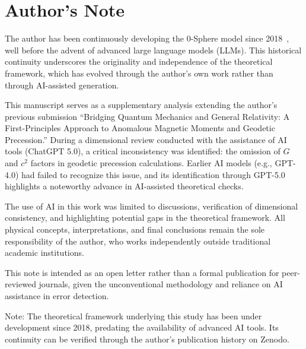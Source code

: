 \documentclass[%
 reprint,
 amsmath,amssymb,
 aps,
]{revtex4-1}
\numberwithin{equation}{section}%
\begin{document}
\section*{Author's Note}
The author has been continuously developing the 0-Sphere model since 2018~\cite{zenodo.16759284}, well before the advent of advanced large language models (LLMs). This historical continuity underscores the originality and independence of the theoretical framework, which has evolved through the author’s own work rather than through AI-assisted generation.

This manuscript serves as a supplementary analysis extending the author's previous submission ``Bridging Quantum Mechanics and General Relativity: A First-Principles Approach to Anomalous Magnetic Moments and Geodetic Precession.'' During a dimensional review conducted with the assistance of AI tools (ChatGPT 5.0), a critical inconsistency was identified: the omission of $G$ and $c^2$ factors in geodetic precession calculations. Earlier AI models (e.g., GPT-4.0) had failed to recognize this issue, and its identification through GPT-5.0 highlights a noteworthy advance in AI-assisted theoretical checks. 

The use of AI in this work was limited to discussions, verification of dimensional consistency, and highlighting potential gaps in the theoretical framework. All physical concepts, interpretations, and final conclusions remain the sole responsibility of the author, who works independently outside traditional academic institutions. 

This note is intended as an open letter rather than a formal publication for peer-reviewed journals, given the unconventional methodology and reliance on AI assistance in error detection. 

\medskip
\noindent
Note: The theoretical framework underlying this study has been under development since 2018, predating the availability of advanced AI tools. Its continuity can be verified through the author's publication history on Zenodo.
\end{document}
